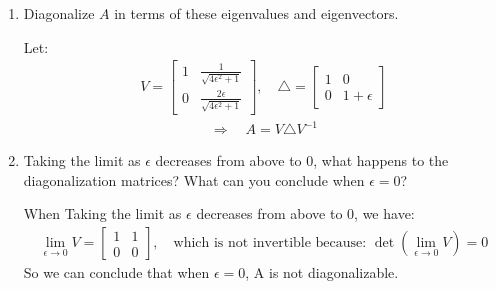 \documentclass[11pt,letterpaper]{article}
\begin{document}
\begin{enumerate}
\begin{enumerate}
    \item 
     Diagonalize $A$ in terms of these eigenvalues and eigenvectors.
    \begin{flushleft}
        Let:
        \begin{align*}
            V  = \begin{bmatrix}
                             1 & \frac{1}{\sqrt{4\epsilon^2 + 1} }\\
                             0 & \frac{2\epsilon}{\sqrt{4\epsilon^2 + 1}}
                            \end{bmatrix}, \quad 
            \triangle  = \begin{bmatrix}
                             1 & 0 \\
                             0 & 1+\epsilon
                            \end{bmatrix} 
        \end{align*}
        \begin{align*}
            \Rightarrow \quad A = V\triangle V^{-1}
        \end{align*}
    \end{flushleft}

    \item 
     Taking the limit as $\epsilon$ decreases from above to $0$, what happens to the diagonalization matrices? What can you conclude when $\epsilon = 0$?
     \begin{flushleft}
         When Taking the limit as $\epsilon$ decreases from above to $0$, we have:
         \begin{align*}
             \lim_{\epsilon \to 0}V  = 
                            \begin{bmatrix}
                             1 & 1\\
                             0 & 0
                            \end{bmatrix}, \quad\text{which is not invertible because: }  \det(\lim_{\epsilon \to 0}V)=0
         \end{align*}
         So we can conclude that when $\epsilon =0$, A is not diagonalizable.
     \end{flushleft}

    
\end{enumerate}





\end{enumerate}
\end{document}
